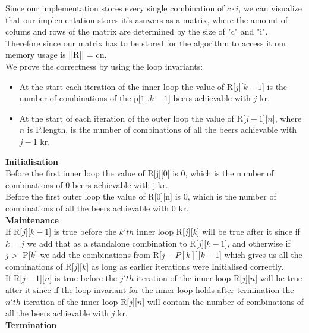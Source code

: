\documentclass[12pt]{article}
\begin{document}
Since our implementation stores every single combination of $c \cdot i$, we can visualize that our implementation stores it's asnwers as a matrix, where the amount of colums and rows of the matrix are determined by the size of "c" and "i". Therefore since our matrix has to be stored for the algorithm to access it our memory usage is ||R|| = cn.\\

We prove the correctness by using the loop invariants:
\begin{itemize}
\item At the start each iteration of the inner loop the value of R[$j$][$k-1$] is the number of combinations of the p[$1..k-1$] beers achievable with $j$ kr.
\item At the start of each iteration of the outer loop the value of R[$j-1$][$n$], where $n$ is P.length, is the number of combinations of all the beers achievable with $j-1$ kr.

\end{itemize}

\textbf{Initialisation}\\
Before the first inner loop the value of R[j][0] is 0, which is the number of combinations of 0 beers achievable with j kr.\\

Before the first outer loop the value of R[0][n] is 0, which is the number of combinations of all the beers achievable with 0 kr.\\

\textbf{Maintenance}\\

If R[$j$][$k-1$] is true before the $k'th$ inner loop R[$j$][$k$] will be true after it since if $k = j$ we add that as a standalone combination to R[$j$][$k-1$], and otherwise if $j>$ P[$k$] we add the combinations from R[$j-P[k]$][$k-1$] which gives us all the combinations of R[$j$][$k$] as long as earlier iterations were Initialised correctly.\\

If R[$j-1$][$n$] is true before the $j'th$ iteration of the inner loop R[$j$][$n$] will be true after it since if the loop invariant for the inner loop holds after termination the $n'th$ iteration of the inner loop R[$j$][$n$] will contain the number of combinations of all the beers achievable with $j$ kr.\\

\textbf{Termination}\\
\end{document}
